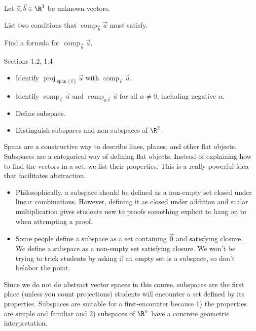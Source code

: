 \documentclass{problemset}
\DeclareMathOperator{\Span}{span}
\DeclareMathOperator{\Comp}{comp}
\DeclareMathOperator{\Proj}{proj}
\begin{document}
	\question
	Let $\vec a,\vec b\in \R^3$ be unknown vectors.
	\begin{parts}
		\item List two conditions that $\Comp_{\vec b} \vec a$ must satisfy.
		\item Find a formula for $\Comp_{\vec b}\vec a$.
	\end{parts}


\begin{lesson}
	\newpage

	Sections 1.2, 1.4

	\begin{itemize}
		\item Identify $\Proj_{\Span\{\vec v\}}\vec u$ with $\Comp_{\vec v}\vec u$.
		\item Identify $\Comp_{\vec v}\vec u$ and $\Comp_{\alpha\vec v}\vec u$
			for all $\alpha\neq 0$, including negative $\alpha$.
		\item Define subspace.
		\item Distinguish subspaces and non-subspaces of $\R^2$.
	\end{itemize}

	Spans are a constructive way to describe lines, planes, and other
	flat objects. Subspaces are a categorical way of defining flat objects.
	Instead of explaining how to find the vectors in a set, we list their
	properties. This is a really powerful idea that facilitates abstraction.

	\begin{annotation}
		\begin{notes}
			\begin{itemize}
			\item	Philosophically, a subspace should be defined
			as a non-empty set closed under linear combinations.
			However, defining it as closed under addition and scalar 
			multiplication gives students new to proofs
			something explicit to hang on to when attempting a proof.
			\item Some people define a subspace as a set containing
			$\vec 0$ and satisfying closure. We define a subspace
			as a non-empty set satisfying closure. We won't be trying
			to trick students by asking if an empty set is a subspace,
			so don't belabor the point.
			\end{itemize}
		\end{notes}
	\end{annotation}
	Since we do not do abstract vector spaces in this course, subspaces are
	the first place (unless you count projections) students will encounter 
	a set defined by its properties. Subspaces are suitable for a first-encounter
	because 1) the properties are simple and familiar and 2) subspaces of $\R^n$
	have a concrete geometric interpretation.

	\newpage
\end{lesson}
\end{document}
